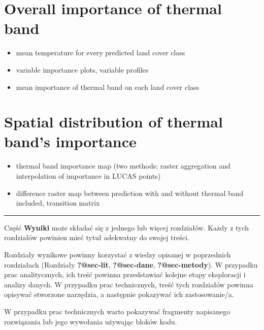 \documentclass{amuthesis}
\begin{document}
\hypertarget{sec-imp-overall}{%
\section{Overall importance of thermal band}\label{sec-imp-overall}}

\begin{itemize}
\item
  mean temperature for every predicted land cover class
\item
  variable importance plots, variable profiles
\item
  mean importance of thermal band on each land cover class
\end{itemize}

\hypertarget{sec-imp-spat}{%
\section{Spatial distribution of thermal band's
importance}\label{sec-imp-spat}}

\begin{itemize}
\item
  thermal band importance map (two methods: raster aggregation and
  interpolation of importance in LUCAS points)
\item
  difference raster map between prediction with and without thermal band
  included, transition matrix
\end{itemize}

\begin{center}\rule{0.5\linewidth}{0.5pt}\end{center}

Część \textbf{Wyniki} może składać się z jednego lub więcej rozdziałów.
Każdy z tych rozdziałów powinien mieć tytuł adekwatny do swojej treści.

Rozdziały wynikowe powinny korzystać z wiedzy opisanej w poprzednich
rozdziałach (Rozdziały \textbf{?@sec-lit}, \textbf{?@sec-dane},
\textbf{?@sec-metody}). W przypadku prac analitycznych, ich treść
powinna przedstawiać kolejne etapy eksploracji i analizy danych. W
przypadku prac technicznych, treść tych rozdziałów powinna opisywać
stworzone narzędzia, a następnie pokazywać ich zastosowanie/a.

W przypadku prac technicznych warto pokazywać fragmenty napisanego
rozwiązania lub jego wywołania używając bloków kodu.

\begin{Shaded}
\begin{Highlighting}[]
\OtherTok{=} 
  \NormalTok{)}
\NormalTok{\}}
\NormalTok{(}\NormalTok{)}
\end{Highlighting}
\end{Shaded}
\end{document}
